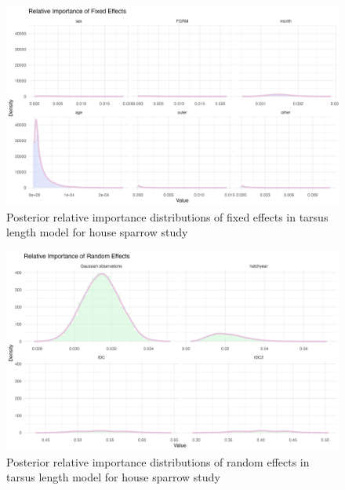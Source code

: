 \begin{figure}[H]%
  \centering
  \includegraphics[width=1\linewidth]{Figures/House sparrow study/Tarsus_fixed.png}
  \caption[Posterior relative importance distributions of fixed effects in tarsus length model for house sparrow study]{Posterior relative importance distributions of fixed effects in tarsus length model for house sparrow study}
  \label{fig:tarsus_fixed_sparrows}
\end{figure}

\begin{figure}[H]%
  \centering
  \includegraphics[width=1\linewidth]{Figures/House sparrow study/Tarsus_random.png}
  \caption[Posterior relative importance distributions of random effects in tarsus length model for house sparrow study]{Posterior relative importance distributions of random effects in tarsus length model for house sparrow study}
  \label{fig:tarsus_random_sparrows}
\end{figure}

